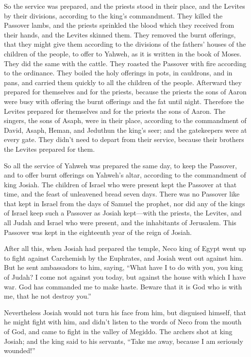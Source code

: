  So the service was prepared, and the priests stood in
their place, and the Levites by their divisions, according to the king's
commandment.  They killed the Passover lambs, and the
priests sprinkled the blood which they received from their hands, and
the Levites skinned them.  They removed the burnt
offerings, that they might give them according to the divisions of the
fathers' houses of the children of the people, to offer to Yahweh, as it
is written in the book of Moses. They did the same with the cattle.
 They roasted the Passover with fire according to the
ordinance. They boiled the holy offerings in pots, in cauldrons, and in
pans, and carried them quickly to all the children of the people.
 Afterward they prepared for themselves and for the
priests, because the priests the sons of Aaron were busy with offering
the burnt offerings and the fat until night. Therefore the Levites
prepared for themselves and for the priests the sons of Aaron.
 The singers, the sons of Asaph, were in their place,
according to the commandment of David, Asaph, Heman, and Jeduthun the
king's seer; and the gatekeepers were at every gate. They didn't need to
depart from their service, because their brothers the Levites prepared
for them.

 So all the service of Yahweh was prepared the same day,
to keep the Passover, and to offer burnt offerings on Yahweh's altar,
according to the commandment of king Josiah.  The
children of Israel who were present kept the Passover at that time, and
the feast of unleavened bread seven days.  There was no
Passover like that kept in Israel from the days of Samuel the prophet,
nor did any of the kings of Israel keep such a Passover as Josiah
kept---with the priests, the Levites, and all Judah and Israel who were
present, and the inhabitants of Jerusalem.  This Passover
was kept in the eighteenth year of the reign of Josiah.

 After all this, when Josiah had prepared the temple,
Neco king of Egypt went up to fight against Carchemish by the Euphrates,
and Josiah went out against him.  But he sent ambassadors
to him, saying, ``What have I to do with you, you king of Judah? I come
not against you today, but against the house with which I have war. God
has commanded me to make haste. Beware that it is God who is with me,
that he not destroy you.''

 Nevertheless Josiah would not turn his face from him,
but disguised himself, that he might fight with him, and didn't listen
to the words of Neco from the mouth of God, and came to fight in the
valley of Megiddo.  The archers shot at king Josiah; and
the king said to his servants, ``Take me away, because I am seriously
wounded!''

